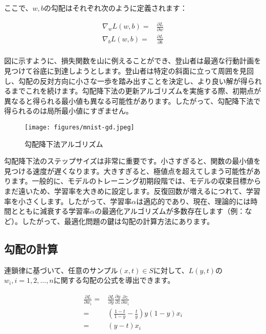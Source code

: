 \begin{content}
ここで、$w,b$の勾配はそれぞれ次のように定義されます：

\[\begin{aligned}
  {\nabla _w}L(w,b) = & \frac{{\partial L}}{{\partial w}} \\ 
  {\nabla _b}L(w,b) = & \frac{{\partial L}}{{\partial b}} \\ 
\end{aligned} \]

図に示すように、損失関数を山に例えることができ、登山者は最適な行動計画を見つけて谷底に到達しようとします。登山者は特定の斜面に立って周囲を見回し、勾配の反対方向に小さな一歩を踏み出すことを決定し、より良い解が得られるまでこれを続けます。勾配降下法の更新アルゴリズムを実施する際、初期点が異なると得られる最小値も異なる可能性があります。したがって、勾配降下法で得られるのは局所最小値にすぎません。

\begin{figure}[H]
\centering
\texttt{[image: figures/mnist-gd.jpeg]}
\caption{勾配降下法アルゴリズム}
 \label{fig:mnist-gd}
\end{figure}

勾配降下法のステップサイズは非常に重要です。小さすぎると、関数の最小値を見つける速度が遅くなります。大きすぎると、極値点を超えてしまう可能性があります。一般的に、モデルのトレーニング初期段階では、モデルの収束目標からまだ遠いため、学習率を大きめに設定します。反復回数が増えるにつれて、学習率を小さくします。したがって、学習率$\alpha$は適応的であり、現在、理論的には時間とともに減衰する学習率$\alpha$の最適化アルゴリズムが多数存在します（例：など）。したがって、最適化問題の鍵は勾配の計算方法にあります。

\subsection{勾配の計算}

連鎖律に基づいて、任意のサンプル$ (x,t) \in S $に対して、$ L(y, t) $の$ w_i, i=1,2,...,n $に関する勾配の公式を導出できます。

\[\begin{aligned}
  \frac{{\partial L}}{{\partial {w_i}}}
   =  & \frac{{\partial L}}{{\partial y}}\frac{{\partial y}}{{\partial z}}\frac{{\partial z}}{{\partial {w_i}}} \\ 
   =  & \left( {\frac{{1 - t}}{{1 - y}} - \frac{t}{y}} \right)y(1 - y){x_i} \\ 
   =  & (y - t){x_i} \\ 
\end{aligned} \]


\end{content}
